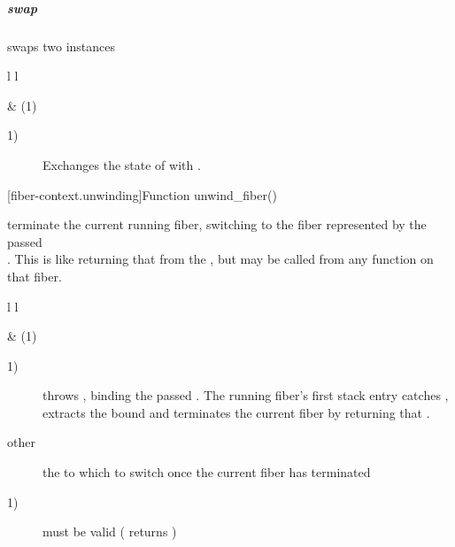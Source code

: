 \subparagraph*{swap}
swaps two \fiber instances\\

\begin{tabular}{ l l }
    \midrule

     & (1)\\

    \midrule
\end{tabular}

\begin{description}
    \item[1)] Exchanges the state of  with .\\
\end{description}


[fiber-context.unwinding]{Function unwind\_fiber()}

terminate the current running fiber, switching to the fiber represented by
the passed\\\fiber. This is like returning that \fiber from the \entryfn, but may
be called from any function on that fiber.\\

\begin{tabular}{ l l }
    \midrule

     & (1)\\

    \midrule
\end{tabular}

\begin{description}
    \item[1)] throws \unwindex, binding the passed \fiber. The running fiber's
              first stack entry catches \unwindex, extracts the bound \fiber
              and terminates the current fiber by returning that \fiber.
\end{description}

\begin{description}
    \item[other] the \fiber to which to switch once the current fiber has terminated
\end{description}

\begin{description}
    \item[1)]  must be valid ( returns )
\end{description}

